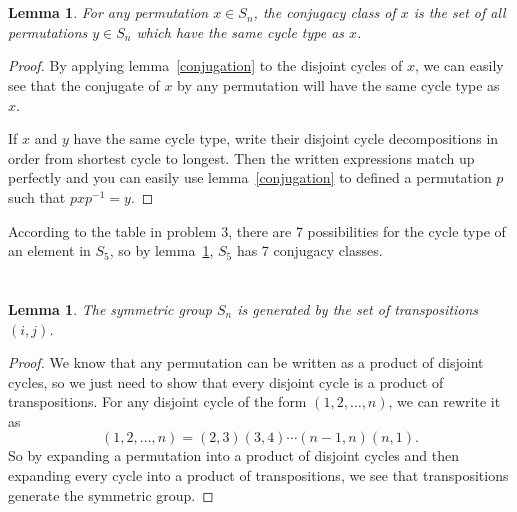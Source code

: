 \documentclass[12pt]{article}
\newtheorem{lem}[thm]{Lemma}
\begin{document}
\section{}
\noindent{}\bigskip

\begin{lem}\label{conj_classes}
    For any permutation $x \in S_n$, the conjugacy class of $x$ is the set of all permutations $y \in S_n$ which have the same cycle type as $x$.
\end{lem}
\begin{proof}
    By applying lemma~\ref{conjugation} to the disjoint cycles of $x$, we can easily see that the conjugate of $x$ by any permutation will have the same cycle type as $x$.
    \par
    If $x$ and $y$ have the same cycle type, write their disjoint cycle decompositions in order from shortest cycle to longest. Then the written expressions match up perfectly and you can easily use lemma~\ref{conjugation} to defined a permutation $p$ such that $pxp^{-1}=y$.
\end{proof}

According to the table in problem 3, there are 7 possibilities for the cycle type of an element in $S_5$, so by lemma~\ref{conj_classes}, $S_5$ has 7 conjugacy classes.

\section{}
\noindent{}\bigskip

\begin{lem}\label{transpositions_generate_s}
    The symmetric group $S_n$ is generated by the set of transpositions $(i,j)$.
\end{lem}
\begin{proof}
    We know that any permutation can be written as a product of disjoint cycles, so we just need to show that every disjoint cycle is a product of transpositions. For any disjoint cycle of the form $(1,2,\dots,n)$, we can rewrite it as
    \[ (1,2,\dots,n) = (2,3) (3,4) \cdots (n-1,n) (n,1). \]
    So by expanding a permutation into a product of disjoint cycles and then expanding every cycle into a product of transpositions, we see that transpositions generate the symmetric group.
\end{proof}
\end{document}
